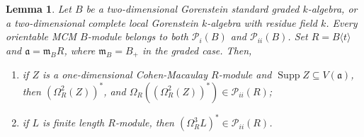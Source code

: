 \documentclass[11pt,letterpaper]{amsart}
\newcommand{\m}{\mathfrak m}
\newcommand{\PiC}{\mathcal P_{i}}
\newcommand{\PiiC}{\mathcal P_{ii}}
\DeclareMathOperator{\Supp}{Supp}
\theoremstyle{plain}
\newtheorem{lem}[thm]{Lemma}
\theoremstyle{definition}
\theoremstyle{remark}
\begin{document}
\begin{lem}\label{lem:9.4}
Let $B$ be a two-dimensional Gorenstein standard graded $k$-algebra, or a
two-dimensional complete local Gorenstein $k$-algebra with residue field $k$.
Every orientable MCM $B$-module belongs to both $\PiC(B)$ and $\PiiC(B)$.
Set $R=B\langle t\rangle$ and $\mathfrak a=\m_B R$, where $\m_B=B_+$ in the graded
case. Then,
\begin{enumerate}
\item[$(i)$] if $Z$ is a
one-dimensional Cohen-Macaulay $R$-module and $\Supp Z\subseteq V(\mathfrak a)$, then $(\Omega^2_R(Z))^*$, and $ \Omega_R((\Omega_R^2(Z))^*)\in\PiiC(R)$;
\item[$(ii)$] if $L$ is finite length $R$-module, then $(\Omega_R^3L)^*\in\PiiC(R)$.
\end{enumerate}
\end{lem}
\end{document}
